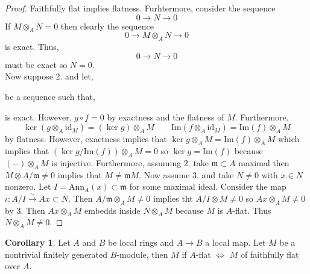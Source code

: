 \documentclass[12pt]{article}
\renewcommand{\Im}[1]{\mathrm{Im}(#1)}
\newcommand{\id}{\mathrm{id}}
\newcommand{\Ann}[2]{\mathrm{Ann}_{#1}\left(#2\right)}
\newcommand{\m}{\mathfrak{m}}
\theoremstyle{remark}
\theoremstyle{definition}
\newtheorem{corollary}[theorem]{Corollary}
\begin{document}
\begin{proof}
Faithfully flat implies flatness. Furhtermore, consider the sequence 
\[ 0 \to N \to 0 \]
If $M \otimes_A N = 0$ then clearly the sequence 
\[ 0 \to M \otimes_A N \to 0\]
is exact. Thus, 
\[ 0 \to N \to 0 \] must be exact so $N = 0$. 
\bigskip\\
Now suppose 2. and let,
\begin{center}
\end{center}
be a sequence such that,
\begin{center}
\end{center}
is exact. However, $g \circ f = 0$ by exactness and the flatness of $M$. Furthermore, 
\[ \ker{(g \otimes_A \id_M)} = (\ker{g}) \otimes_A M \quad \quad \Im{f \otimes_A \id_M} = \Im{f} \otimes_A M \]
by flatness. However, exactness implies that $\ker{g} \otimes_A M = \Im{f} \otimes_A M$ which implies that $(\ker{g} / \Im{f}) \otimes_A M  = 0$ so $\ker{g} = \Im{f}$ because $(-) \otimes_A M$ is injective. Furthermore, assuming 2. take $\m \subset A$ maximal then $M \otimes A / \m \neq 0$ implies that $M \neq \m M$. Now assume 3. and take $N \neq 0$ with $x \in N$ nonzero. Let $I = \Ann{A}{x} \subset \m$ for some maximal ideal. Consider the map $\iota : A / I \xrightarrow{\sim} A x \subset N$. Then $A / \m \otimes_A M \neq 0$ implies tht $A / I \otimes M \neq 0$ so $A x \otimes_A M \neq 0$ by 3. Then $A x \otimes_A M$ embedds inside $N \otimes_A M$ because $M$ is $A$-flat. Thus $N \otimes_A M \neq 0$. 
\end{proof}

\begin{corollary}
Let $A$ and $B$ be local rings and $A \to B$ a local map. Let $M$ be a nontrivial finitely generated $B$-module, then $M$ if $A$-flat $\iff$ $M$ of faithfully flat over $A$.
\end{corollary}
\end{document}
